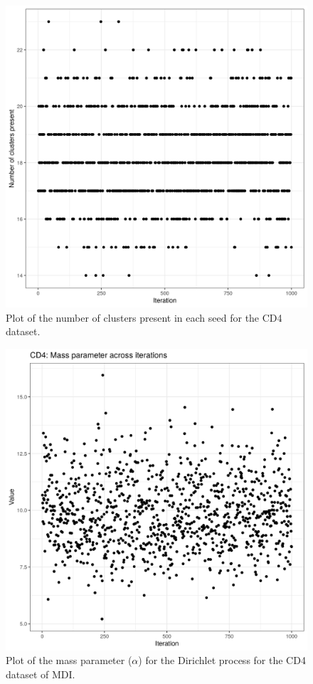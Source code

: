 \documentclass[12pt]{article} %
\begin{document}
	
	\begin{figure}[h]
		\centering
		\includegraphics[scale=0.75]{Images/Biology_data/Set_1000/All_datasets/Cluster_series_plots/CD4.png}
		\caption{Plot of the number of clusters present in each seed for the CD4 dataset.}
		\label{fig:results:cedar_2:mdi_cd4_number_clusters_plot}
	\end{figure}
	
	\newpage
	
	\begin{figure}[h]
		\centering
		\includegraphics[scale=0.75]{Images/Biology_data/Set_1000/All_datasets/Mass_parameter_plots/CD4.png}
		\caption{Plot of the mass parameter ($\alpha$) for the Dirichlet process for the CD4 dataset of MDI.}
		\label{fig:results:cedar_2:mdi_cd4_mass_parameter_plot}
	\end{figure}
	
\end{document}
